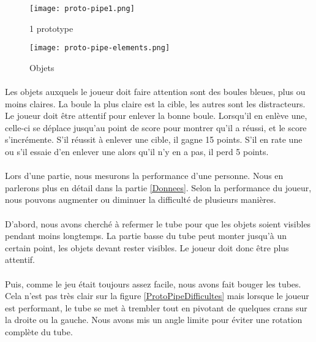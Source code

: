 \begin{figure}[H]
    \begin{center}
    \texttt{[image: proto-pipe1.png]}
    \end{center}
    \caption{1 prototype}
\label{ProtoPipe1}
\end{figure}

\begin{wrapfigure}[9]{l}{3cm}
    \vspace{-10pt}
    \texttt{[image: proto-pipe-elements.png]}
    \captionsetup{labelformat=simpleNumber}
    \caption{Objets}
\end{wrapfigure}

\paragraph{}Les objets auxquels le joueur doit faire attention sont des boules bleues, plus ou moins claires. La boule la plus claire est la cible, les autres sont les distracteurs. Le
joueur doit être attentif pour enlever la bonne boule. Lorsqu'il en enlève une, celle-ci se déplace jusqu'au point de score pour montrer qu'il a réussi, et le score s'incrémente.
S'il réussit à enlever une cible, il gagne 15 points. S'il en rate une ou s'il essaie d'en enlever une alors qu'il n'y en a pas, il perd 5 points.

\newpage

\paragraph{}Lors d'une partie, nous mesurons la performance d'une personne. Nous en parlerons plus en détail dans la partie \ref{Donnees}. Selon la performance du joueur, nous pouvons
augmenter ou diminuer la difficulté de plusieurs manières.

\paragraph{}D'abord, nous avons cherché à refermer le tube pour que les objets soient visibles pendant moins longtemps. La partie basse du tube peut monter jusqu'à un certain point, les objets
devant rester visibles. Le joueur doit donc être plus attentif.

\paragraph{}Puis, comme le jeu était toujours assez facile, nous avons fait bouger les tubes. Cela n'est pas très clair sur la figure \ref{ProtoPipeDifficultes} mais lorsque le joueur est
performant, le tube se met à trembler tout en pivotant de quelques crans sur la droite ou la gauche. Nous avons mis un angle limite pour éviter une rotation complète du tube.

